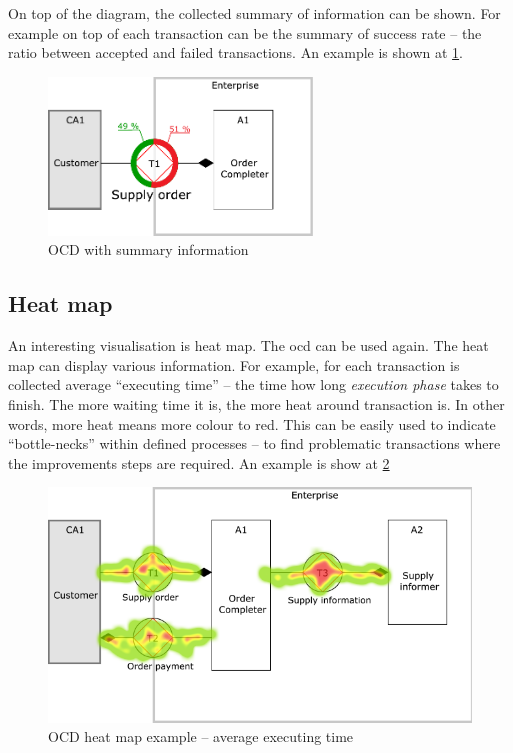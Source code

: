 On top of the diagram, the collected summary of information can be shown. For example on top of each transaction can be the summary of success rate -- the ratio between accepted and failed transactions. An example is shown at \cref{fig:ocd-sum}.

\begin{figure}[ht!]
\centering
\includegraphics[width=7cm,keepaspectratio]{img/ocd-sum}
\caption{OCD with summary information}
\label{fig:ocd-sum}
\end{figure}
\subsection{Heat map}
An interesting visualisation is heat map. The \gls{ocd} can be used again. The heat map can display various information. For example, for each transaction is collected average ``executing time'' -- the time how long  \textit{execution phase} takes to finish. The more waiting time it is, the more heat around transaction is. In other words, more heat means more colour to red. This can be easily used to indicate ``bottle-necks'' within defined processes -- to find problematic transactions where the improvements steps are required. An example is show at \cref{fig:ocd-heat-map}

\begin{figure}[ht!]
\centering
\includegraphics[width=12cm,keepaspectratio]{img/ocd-heat-map}
\caption{OCD heat map example -- average executing time}
\label{fig:ocd-heat-map}
\end{figure}
